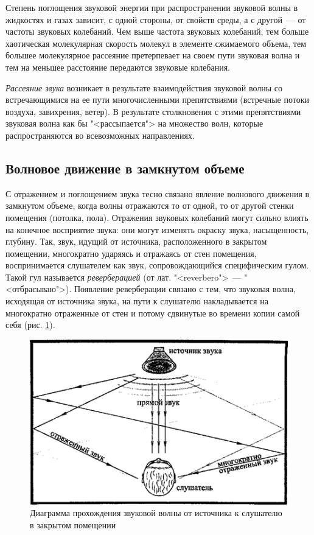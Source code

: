\documentclass[oneside, final, 14pt]{extreport}
\begin{document}
Степень поглощения звуковой энергии при распространении звуковой волны в жидкостях и газах зависит, с одной стороны, от свойств среды, а с другой~--- от частоты звуковых колебаний. Чем выше частота звуковых колебаний, тем больше хаотическая молекулярная скорость молекул в элементе сжимаемого объема, тем большее молекулярное рассеяние претерпевает на своем пути звуковая волна и тем на меньшее расстояние передаются звуковые колебания.

{\itshape Рассеяние звука} возникает в результате взаимодействия звуковой волны со встречающимися на ее пути многочисленными препятствиями (встречные потоки воздуха, завихрения, ветер). В результате столкновения с этими препятствиями звуковая волна как бы "<рассыпается"> на множество волн, которые распространяются во всевозможных направлениях.

\subsection{Волновое движение в замкнутом объеме}
С отражением и поглощением звука тесно связано явление волнового движения в замкнутом объеме, когда волны отражаются то от одной, то от другой стенки помещения (потолка, пола). Отражения звуковых колебаний могут сильно влиять на конечное восприятие звука: они могут изменять окраску звука, насыщенность, глубину. Так, звук, идущий от источника, расположенного в закрытом помещении, многократно ударяясь и отражаясь от стен помещения, воспринимается слушателем как звук, сопровождающийся специфическим гулом. Такой гул называется {\itshape реверберацией} (от лат. "<reverbero">~--- "<отбрасываю">). Появление реверберации связано с тем, что звуковая волна, исходящая от источника звука, на пути к слушателю накладывается на многократно отраженные от стен и потому сдвинутые во времени копии самой себя (рис. \ref{pic-reverberation-01}).

\begin{figure}[h]
\centering
\includegraphics{pic-reverberation-01}
\caption{Диаграмма прохождения звуковой волны от источника к слушателю в закрытом помещении}
\label{pic-reverberation-01}
\end{figure}
\end{document}
